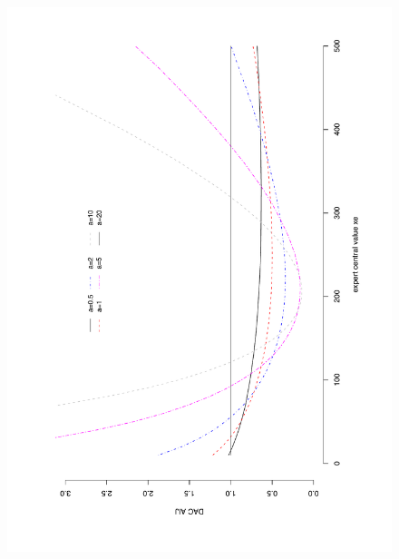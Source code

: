 \begin{figure}[h!]
    \centering
    \includegraphics[scale=0.4,angle=270]{figures/critics/expograph1DACAIJ.pdf}

\end{figure}
